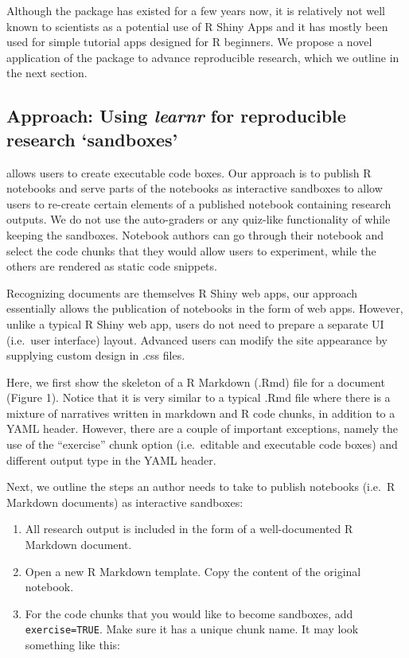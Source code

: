Although the  package has existed for a few years now, it is
relatively not well known to scientists as a potential use of R Shiny
Apps and it has mostly been used for simple tutorial apps designed for R
beginners. We propose a novel application of the  package to
advance reproducible research, which we outline in the next section.

\hypertarget{approach-using-learnr-for-reproducible-research-sandboxes}{%
\subsection{\texorpdfstring{Approach: Using \emph{learnr} for
reproducible research
`sandboxes'}{Approach: Using learnr for reproducible research `sandboxes'}}\label{approach-using-learnr-for-reproducible-research-sandboxes}}

 allows users to create executable code boxes. Our approach
is to publish R notebooks and serve parts of the notebooks as
interactive sandboxes to allow users to re-create certain elements of a
published notebook containing research outputs. We do not use the
auto-graders or any quiz-like functionality of  while
keeping the sandboxes. Notebook authors can go through their notebook
and select the code chunks that they would allow users to experiment,
while the others are rendered as static code snippets.

Recognizing  documents are themselves R Shiny web apps, our
approach essentially allows the publication of notebooks in the form of
web apps. However, unlike a typical R Shiny web app, users do not need
to prepare a separate UI (i.e.~user interface) layout. Advanced users
can modify the site appearance by supplying custom design in .css files.

Here, we first show the skeleton of a R Markdown (.Rmd) file for a
 document (Figure 1). Notice that it is very similar to a
typical .Rmd file where there is a mixture of narratives written in
markdown and R code chunks, in addition to a YAML header. However, there
are a couple of important exceptions, namely the use of the ``exercise''
chunk option (i.e.~editable and executable code boxes) and different
output type in the YAML header.

Next, we outline the steps an author needs to take to publish notebooks
(i.e.~R Markdown documents) as interactive sandboxes:

\begin{enumerate}
\def\labelenumi{\arabic{enumi}.}
\tightlist
\item
  All research output is included in the form of a well-documented R
  Markdown document.
\item
  Open a new  R Markdown template. Copy the content of the
  original notebook.
\item
  For the code chunks that you would like to become sandboxes, add
  \texttt{exercise=TRUE}. Make sure it has a unique chunk name. It may
  look something like this:
\end{enumerate}

